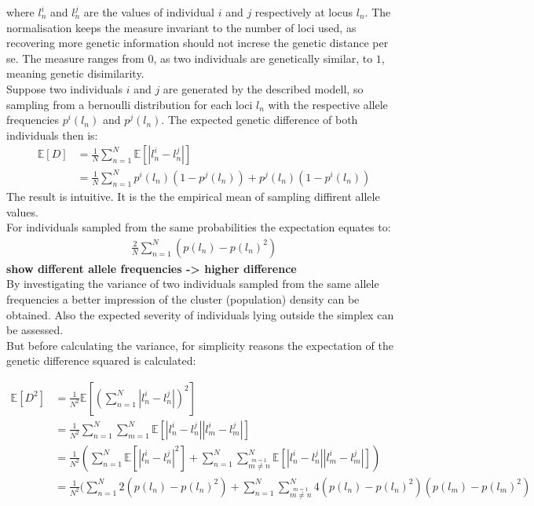 \documentclass[a4paper, 11pt]{article}
\begin{document}
where $l^i_n$ and $l^j_n$ are the values of individual $i$ and $j$ respectively at locus $l_n$. The normalisation keeps the measure invariant to the number of loci used, as recovering more genetic information should not increse the genetic distance per se. The measure ranges from $0$, as two individuals are genetically similar, to $1$, meaning genetic disimilarity.
\\
Suppose two individuals $i$ and $j$ are generated by the described modell, so sampling from a bernoulli distribution for each loci $l_n$ with the respective allele frequencies $p^i(l_n)$ and $p^j(l_n)$. The expected genetic difference of both individuals then is: 
\begin{align*}
\mathbb{E}[D] &= \frac{1}{N}\sum^{N}_{n = 1} \mathbb{E}[|l^i_n - l^j_n|] \\
&= \frac{1}{N} \sum^{N}_{n = 1} p^i(l_n)(1-p^j(l_n)) + p^j(l_n)(1-p^i(l_n))
\end{align*}
The result is intuitive. It is the the empirical mean of sampling diffirent allele values. \\
For individuals sampled from the same probabilities the expectation equates to:
\begin{align*}
\frac{2}{N} \sum^{N}_{n = 1} (p(l_n) - p(l_n)^2)
\end{align*}
\textbf{show different allele frequencies -> higher difference}
\\
By investigating the variance of two individuals sampled from the same allele frequencies a better impression of the cluster (population) density can be obtained. Also the expected severity of individuals lying outside the simplex can be assessed. \\
But before calculating the variance, for simplicity reasons the expectation of the genetic difference squared is calculated:

\begin{align*}
\mathbb{E}[D^2] &= \frac{1}{N^2} \mathbb{E}[(\sum^{N}_{n = 1} |l^i_n - l^j_n|)^2] \\
&= \frac{1}{N^2} \sum^{N}_{n = 1}\sum^{N}_{m = 1}\mathbb{E}[ |l^i_n - l^j_n||l^i_m - l^j_m|] \\
&= \frac{1}{N^2}( \sum^{N}_{n = 1}\mathbb{E}[|l^i_n - l^j_n|^2] + \sum^{N}_{n = 1}\sum^{N}_{\overset{m = 1}{m \neq n}} \mathbb{E}[|l^i_n - l^j_n||l^i_m - l^j_m|]) \\
&= \frac{1}{N^2}( \sum^{N}_{n = 1}2(p(l_n) - p(l_n)^2) + \sum^{N}_{n = 1}\sum^{N}_{\overset{m = 1}{m \neq n}} 4(p(l_n)-p(l_n)^2)(p(l_m)-p(l_m)^2) \\
\end{align*}
\end{document}
